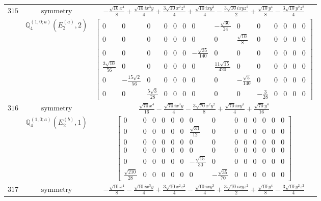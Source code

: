 \documentclass[fleqn,8pt,landscape]{jsarticle}
\begin{document}
\begin{longtable}{ccc}
$ 315 $ & $ \text{symmetry} $ & $ - \frac{\sqrt{10} x^{4}}{8} + \frac{\sqrt{10} i x^{3} y}{4} + \frac{3 \sqrt{10} x^{2} z^{2}}{4} + \frac{\sqrt{10} i x y^{3}}{4} - \frac{3 \sqrt{10} i x y z^{2}}{2} + \frac{\sqrt{10} y^{4}}{8} - \frac{3 \sqrt{10} y^{2} z^{2}}{4} $ \\
$  $ & $ \mathbb{Q}_{4}^{(1,0;a)}(E_{2}^{(a)},2) $ & $ \begin{bmatrix} 0 & 0 & 0 & 0 & 0 & 0 & 0 & - \frac{\sqrt{30}}{24} & 0 & 0 & 0 & 0 & 0 & 0 \\ 0 & 0 & 0 & 0 & 0 & 0 & 0 & 0 & \frac{\sqrt{10}}{8} & 0 & 0 & 0 & 0 & 0 \\ 0 & 0 & 0 & 0 & 0 & 0 & - \frac{\sqrt{35}}{140} & 0 & 0 & 0 & 0 & 0 & 0 & 0 \\ \frac{3 \sqrt{10}}{56} & 0 & 0 & 0 & 0 & 0 & 0 & \frac{11 \sqrt{15}}{420} & 0 & 0 & 0 & 0 & 0 & 0 \\ 0 & - \frac{15 \sqrt{2}}{56} & 0 & 0 & 0 & 0 & 0 & 0 & - \frac{\sqrt{5}}{140} & 0 & 0 & 0 & 0 & 0 \\ 0 & 0 & \frac{5 \sqrt{3}}{28} & 0 & 0 & 0 & 0 & 0 & 0 & - \frac{3}{28} & 0 & 0 & 0 & 0 \end{bmatrix} $ \\ \hline
$ 316 $ & $ \text{symmetry} $ & $ \frac{\sqrt{70} x^{4}}{16} - \frac{\sqrt{70} i x^{3} y}{4} - \frac{3 \sqrt{70} x^{2} y^{2}}{8} + \frac{\sqrt{70} i x y^{3}}{4} + \frac{\sqrt{70} y^{4}}{16} $ \\
$  $ & $ \mathbb{Q}_{4}^{(1,0;a)}(E_{2}^{(b)},1) $ & $ \begin{bmatrix} 0 & 0 & 0 & 0 & 0 & 0 & 0 & 0 & 0 & 0 & 0 & 0 & 0 & 0 \\ 0 & 0 & 0 & 0 & 0 & 0 & \frac{\sqrt{30}}{12} & 0 & 0 & 0 & 0 & 0 & 0 & 0 \\ 0 & 0 & 0 & 0 & 0 & 0 & 0 & 0 & 0 & 0 & 0 & 0 & 0 & 0 \\ 0 & 0 & 0 & 0 & 0 & 0 & 0 & 0 & 0 & 0 & 0 & 0 & 0 & 0 \\ 0 & 0 & 0 & 0 & 0 & 0 & - \frac{\sqrt{15}}{30} & 0 & 0 & 0 & 0 & 0 & 0 & 0 \\ \frac{\sqrt{210}}{28} & 0 & 0 & 0 & 0 & 0 & 0 & - \frac{\sqrt{35}}{70} & 0 & 0 & 0 & 0 & 0 & 0 \end{bmatrix} $ \\ \hline
$ 317 $ & $ \text{symmetry} $ & $ - \frac{\sqrt{10} x^{4}}{8} - \frac{\sqrt{10} i x^{3} y}{4} + \frac{3 \sqrt{10} x^{2} z^{2}}{4} - \frac{\sqrt{10} i x y^{3}}{4} + \frac{3 \sqrt{10} i x y z^{2}}{2} + \frac{\sqrt{10} y^{4}}{8} - \frac{3 \sqrt{10} y^{2} z^{2}}{4} $ \\

\end{longtable}
\end{document}
